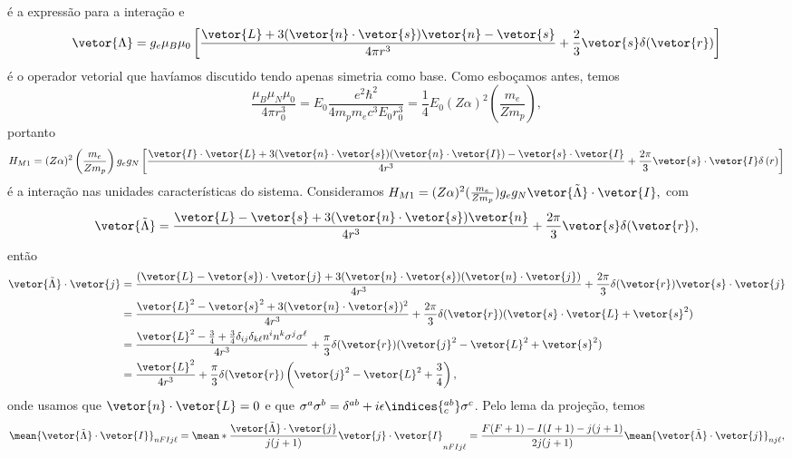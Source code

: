 é a expressão para a interação e 
\begin{equation*}
   \vetor{\Lambda} = g_e \mu_B \mu_0 \left[\frac{\vetor{L} + 3(\vetor{n}\cdot \vetor{s})\vetor{n} - \vetor{s}}{4\pi r^3} + \frac23 \vetor{s} \delta(\vetor{r})\right]
\end{equation*}
é o operador vetorial que havíamos discutido tendo apenas simetria como base. Como esboçamos antes, temos
\begin{equation*}
   \frac{\mu_B \mu_N\mu_0}{4\pi r_0^3} = E_0\frac{e^2 \hbar^2}{4m_p m_e c^3 E_0r_0^3} = \frac14 E_0(Z \alpha)^2\left(\frac{m_e}{Zm_p}\right),
\end{equation*}
portanto
\begin{equation*}
   H_{M1} = (Z\alpha)^2 \left(\frac{m_e}{Z m_p}\right)g_e g_N\left[\frac{\vetor{I} \cdot \vetor{L} + 3 (\vetor{n}\cdot\vetor{s})(\vetor{n} \cdot \vetor{I}) - \vetor{s} \cdot \vetor{I}}{4r^3} + \frac{2\pi}3 \vetor{s} \cdot \vetor{I} \delta\left(r\right)\right]
\end{equation*}
é a interação nas unidades características do sistema. Consideramos \(H_{M1} = (Z \alpha)^2 (\frac{m_e}{Z m_p})g_e g_N \vetor{\tilde{\Lambda}}\cdot\vetor{I},\) com
\begin{equation*}
   \vetor{\tilde{\Lambda}} = \frac{\vetor{L} - \vetor{s} + 3 (\vetor{n}\cdot\vetor{s}) \vetor{n}}{4r^3} + \frac{2\pi}3 \vetor{s} \delta(\vetor{r}),
\end{equation*}
então 
\begin{align*}
   \vetor{\tilde{\Lambda}} \cdot \vetor{j}
   &= \frac{(\vetor{L} - \vetor{s})\cdot \vetor{j} + 3(\vetor{n}\cdot \vetor{s})(\vetor{n} \cdot \vetor{j})}{4r^3} + \frac{2\pi}3  \delta(\vetor{r})\vetor{s}\cdot \vetor{j}\\
   &= \frac{\vetor{L}^2 - \vetor{s}^2 + 3(\vetor{n} \cdot \vetor{s})^2}{4r^3} + \frac{2\pi}{3} \delta(\vetor{r}) (\vetor{s}\cdot\vetor{L} + \vetor{s}^2)\\
   &= \frac{\vetor{L}^2 - \frac34 + \frac{3}{4} \delta_{ij} \delta_{k\ell} n^i n^k \sigma^j \sigma^\ell}{4r^3} + \frac{\pi}{3}\delta(\vetor{r}) (\vetor{j}^2 - \vetor{L}^2 + \vetor{s}^2)\\
   &= \frac{\vetor{L}^2}{4r^3} + \frac{\pi}{3} \delta(\vetor{r}) \left(\vetor{j}^2 - \vetor{L}^2 + \frac34\right),
\end{align*}
onde usamos que \(\vetor{n} \cdot \vetor{L} = 0\) e que \(\sigma^a \sigma^b = \delta^{ab} + i \epsilon\indices{_c^{ab}} \sigma^c\). Pelo lema da projeção, temos
\begin{equation*}
   \mean{\vetor{\tilde{\Lambda}}\cdot\vetor{I}}_{nFIj\ell} = \mean*{\frac{\vetor{\tilde{\Lambda}}\cdot \vetor{j}}{j(j+1)}\vetor{j} \cdot \vetor{I}}_{nFIj\ell} = \frac{F(F+1) - I(I+1) - j(j+1)}{2j(j+1)}\mean{\vetor{\tilde{\Lambda}}\cdot \vetor{j}}_{nj\ell},
\end{equation*}
